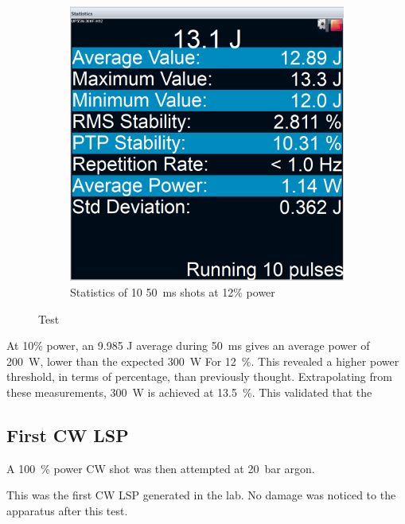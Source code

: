 \begin{figure}[h]
\begin{subfigure}[t]{0.45\textwidth}
                    \includegraphics[width=\textwidth]{assets/5 results/12p 50ms Statistics.png}
                    \caption{Statistics of 10 \qty{50}{ms} shots at 12\% power}
                \end{subfigure}
                \caption{Test}
            \end{figure}
            
            At 10\% power, an 9.985 J average during \qty{50}{ms} gives an average power of \qty{200}{W}, lower than the expected \qty{300}{W} For \qty{12}{\%}. This revealed a higher power threshold, in terms of percentage, than previously thought. Extrapolating from these measurements, \qty{300}{W} is achieved at \qty{13.5}{\%}. This validated that the 

        \subsection{First CW LSP}
            
            A \qty{100}{\%} power CW shot was then attempted at \qty{20}{bar} argon. 


            This was the first CW LSP generated in the lab. No damage was noticed to the apparatus after this test.

